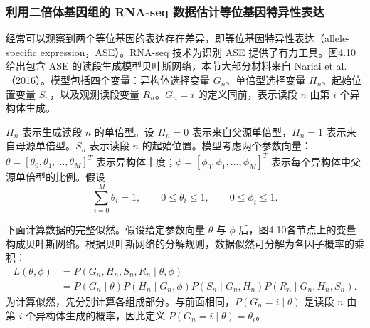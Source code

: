 \subsubsection{利用二倍体基因组的 RNA-seq 数据估计等位基因特异性表达}

经常可以观察到两个等位基因的表达存在差异，即等位基因特异性表达（allele-specific expression，ASE）。RNA-seq 技术为识别 ASE 提供了有力工具。图4.10给出包含 ASE 的读段生成模型贝叶斯网络，本节大部分材料来自 Nariai et al.（2016）。模型包括四个变量：异构体选择变量 $G_n$、单倍型选择变量 $H_n$、起始位置变量 $S_n$，以及观测读段变量 $R_n$。$G_n=i$ 的定义同前，表示读段 $n$ 由第 $i$ 个异构体生成。

$H_n$ 表示生成读段 $n$ 的单倍型。设 $H_n=0$ 表示来自父源单倍型，$H_n=1$ 表示来自母源单倍型。$S_n$ 表示读段 $n$ 的起始位置。模型考虑两个参数向量：$\theta=[\theta_0,\theta_1,\ldots,\theta_M]^T$ 表示异构体丰度；$\phi=[\phi_0,\phi_1,\ldots,\phi_M]^T$ 表示每个异构体中父源单倍型的比例。假设
\[
\sum_{i=0}^{M}\theta_i=1,\qquad0\le\theta_i\le1,\qquad0\le\phi_i\le1.
\]


下面计算数据的完整似然。假设给定参数向量 $\theta$ 与 $\phi$ 后，图4.10各节点上的变量构成贝叶斯网络。根据贝叶斯网络的分解规则，数据似然可分解为各因子概率的乘积：
\begin{equation}
\begin{aligned}
L(\theta,\phi)&=P(G_n,H_n,S_n,R_n\mid\theta,\phi)\\
&=P(G_n\mid\theta)P(H_n\mid G_n,\phi)P(S_n\mid G_n,H_n)P(R_n\mid G_n,H_n,S_n).
\end{aligned}
\tag{4.42}
\end{equation}
为计算似然，先分别计算各组成部分。与前面相同，$P(G_n=i\mid\theta)$ 是读段 $n$ 由第 $i$ 个异构体生成的概率，因此定义 $P(G_n=i\mid\theta)=\theta_i$。

